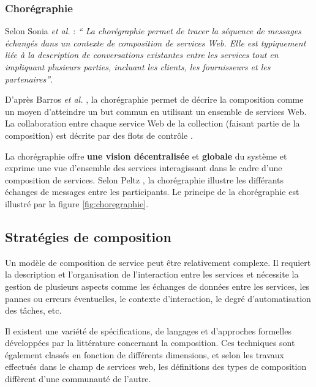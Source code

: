       \subsubsection{Chorégraphie}
      \label{sec:choregraphie-sec}
      Selon Sonia \emph{et al.} \cite{jamal2005environnement} :
      \emph{`` La chorégraphie permet de tracer la séquence de
        messages échangés dans un contexte de composition de services
        Web. Elle est typiquement liée à la description de
        conversations existantes entre les services tout en impliquant
        plusieurs parties, incluant les clients, les fournisseurs et
        les partenaires''}.

      D'après Barros \emph{et al.} \cite{barros2006standards}, la
      chorégraphie permet de décrire la composition comme un moyen
      d'atteindre un but commun en utilisant un ensemble de services
      Web. La collaboration entre chaque service Web de la collection
      (faisant partie de la composition) est décrite par des flots de
      contrôle \cite{lopez2008selection}.

      La chorégraphie offre \textbf{une vision décentralisée} et
      \textbf{globale} du système et exprime une vue d'ensemble des
      services interagissant dans le cadre d'une composition de
      services. Selon Peltz \cite{peltz2003web}, la chorégraphie
      illustre les différants échanges de messages entre les
      participants. Le principe de la chorégraphie est illustré par la
      figure \ref{fig:choregraphie}.

    \subsection{Stratégies de composition}
    \label{sec:types-de-composition}
    Un modèle de composition de service peut être relativement
    complexe. Il requiert la description et l'organisation de
    l'interaction entre les services et nécessite la gestion de
    plusieurs aspects comme les échanges de données entre les
    services, les pannes ou erreurs éventuelles, le contexte
    d'interaction, le degré d'automatisation des tâches, etc.
    
    Il existent une variété de spécifications, de langages et
    d'approches formelles développées par la littérature concernant la
    composition. Ces techniques sont également classés en fonction de
    différents dimensions, et selon les travaux effectués dans le
    champ de services web, les définitions des types de composition
    diffèrent d'une communauté de l'autre.
 

